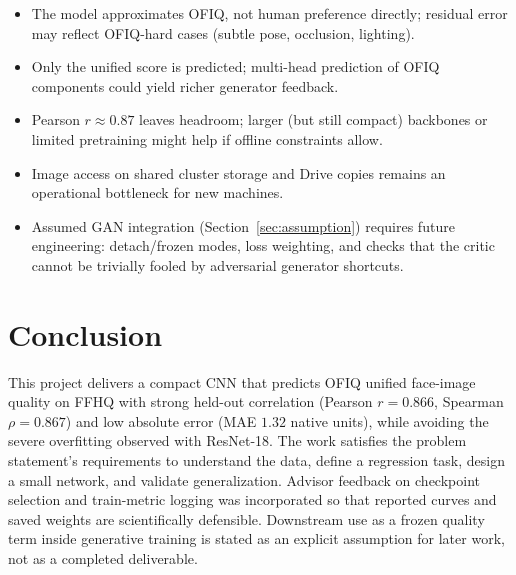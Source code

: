 \documentclass[12pt, letterpaper, titlepage]{article}
\begin{document}
\begin{itemize}[leftmargin=*]
    \item The model approximates OFIQ, not human preference directly; residual error may reflect OFIQ-hard cases (subtle pose, occlusion, lighting).
    \item Only the unified score is predicted; multi-head prediction of OFIQ components could yield richer generator feedback.
    \item Pearson $r\approx 0.87$ leaves headroom; larger (but still compact) backbones or limited pretraining might help if offline constraints allow.
    \item Image access on shared cluster storage and Drive copies remains an operational bottleneck for new machines.
    \item Assumed GAN integration (Section~\ref{sec:assumption}) requires future engineering: detach/frozen modes, loss weighting, and checks that the critic cannot be trivially fooled by adversarial generator shortcuts.
\end{itemize}

\FloatBarrier
\section{Conclusion}
\label{sec:conclusion}

This project delivers a compact CNN that predicts OFIQ unified face-image quality on FFHQ with strong held-out correlation (Pearson $r=0.866$, Spearman $\rho=0.867$) and low absolute error (MAE $1.32$ native units), while avoiding the severe overfitting observed with ResNet-18. The work satisfies the problem statement's requirements to understand the data, define a regression task, design a small network, and validate generalization. Advisor feedback on checkpoint selection and train-metric logging was incorporated so that reported curves and saved weights are scientifically defensible. Downstream use as a frozen quality term inside generative training is stated as an explicit assumption for later work, not as a completed deliverable.

\clearpage

\end{document}
